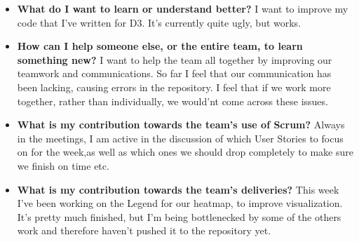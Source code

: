 \documentclass[]{article}
\begin{document}
\begin{itemize}
    \item \textbf{What do I want to learn or understand better?} \newline
    I want to improve my code that I've written for D3. It's currently quite ugly, but works.
    
    \item \textbf{How can I help someone else, or the entire team, to learn something new?} \newline
    I want to help the team all together by improving our teamwork and communications. So far I feel that our communication has been lacking, causing errors in the repository. I feel that if we work more together, rather than individually, we would'nt come across these issues.
    
    \item \textbf{What is my contribution towards the team’s use of Scrum?} \newline
    Always in the meetings, I am active in the discussion of which User Stories to focus on for the week,as well as which ones we should drop completely to make sure we finish on time etc.
    
    \item \textbf{What is my contribution towards the team’s deliveries?} \newline
    This week I've been working on the Legend for our heatmap, to improve visualization. It's pretty much finished, but I'm being bottlenecked by some of the others work and therefore haven't pushed it to the repository yet.

 
 
\end{itemize}
\end{document}
